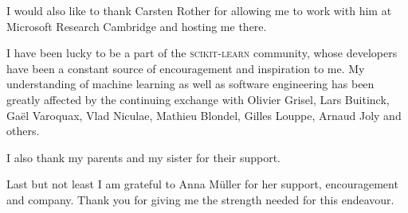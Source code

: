 \documentclass[12pt,toc=bibnumbered, a4paper,twoside,DIV=11,BCOR=1cm]{scrbook}
\begin{document}
I would also like to thank Carsten Rother for allowing me to work with him
at Microsoft Research Cambridge and hosting me there.

I have been lucky to be a part of the \textsc{scikit-learn} community, whose developers
have been a constant source of encouragement and inspiration to me. My
understanding of machine learning as well as software engineering has been
greatly affected by the continuing exchange with Olivier Grisel, Lars Buitinck,
Ga\"el Varoquax, Vlad Niculae, Mathieu Blondel, Gilles Louppe, Arnaud Joly and
others.

I also thank my parents and my sister for their support.

Last but not least I am grateful to Anna M\"uller for her support,
encouragement and company. Thank you for giving me the strength needed for this
endeavour.
\cleardoublepage
{}


%













\end{document}
